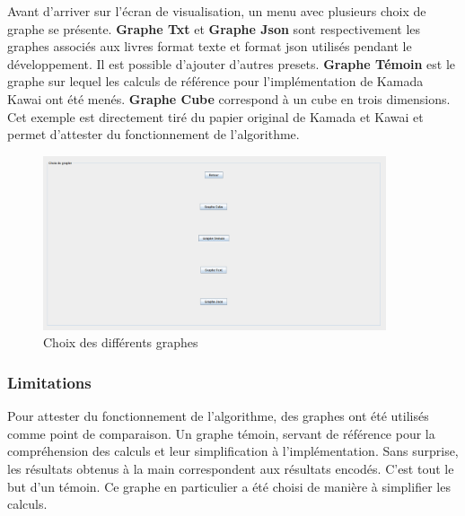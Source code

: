 \documentclass[a4paper,12pt]{article}
\begin{document}
Avant d’arriver sur l’écran de visualisation, un menu avec plusieurs choix de graphe se présente. \textbf{Graphe Txt} et \textbf{Graphe Json} sont respectivement les graphes associés aux livres format texte et format json utilisés pendant le développement. Il est possible d’ajouter d’autres presets. \textbf{Graphe Témoin} est le graphe sur lequel les calculs de référence pour l’implémentation de Kamada Kawai ont été menés. \textbf{Graphe Cube} correspond à un cube en trois dimensions. Cet exemple est directement tiré du papier original de Kamada et Kawai et permet d’attester du fonctionnement de l’algorithme.

\begin {figure}[H]
    \centering
    \includegraphics[width=0.9\textwidth]{choix_graphe.png}
    \caption{Choix des différents graphes}
\end {figure}

\subsubsection{Limitations}

Pour attester du fonctionnement de l’algorithme, des graphes ont été utilisés comme point de comparaison. Un graphe témoin, servant de référence pour la compréhension des calculs et leur simplification à l’implémentation. Sans surprise, les résultats obtenus à la main correspondent aux résultats encodés. C’est tout le but d’un témoin. Ce graphe en particulier a été choisi de manière à simplifier les calculs.
\end{document}
